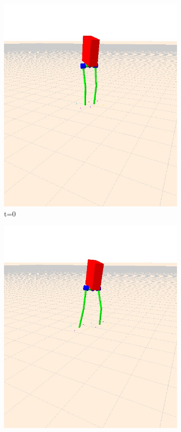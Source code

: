 \documentclass[letterpaper, 10 pt, conference]{ieeeconf}  %
\begin{document}
\begin{figure}[tbp]
  \centering
  \begin{subfigure}[b]{0.3\textwidth}
    \centering
    \includegraphics[width=\textwidth] {figures/balanceNoYaw1.jpg}
    \caption{t=0}
    \label{fig:balanceNoYaw1}
  \end{subfigure}\hfill
  \begin{subfigure}[b]{0.3\textwidth}
    \centering
    \includegraphics[width=\textwidth] {figures/balanceNoYaw2.jpg} 

\end{subfigure}
\end{figure}
\end{document}
